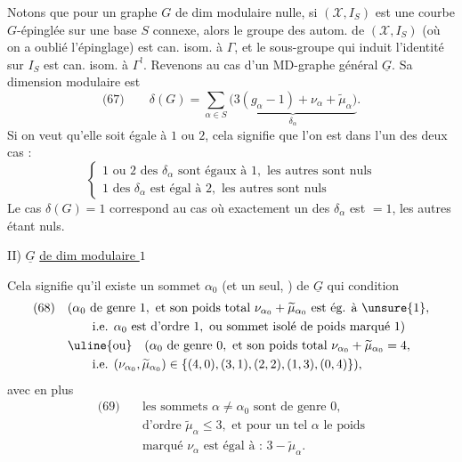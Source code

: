 Notons que pour un graphe $G$ de dim modulaire nulle, si $(\mathcal X,I_S)$ est une courbe  $G$-épinglée sur une base $S$ connexe, alors le groupe des autom. de $(\mathcal X,I_S)$ (où on a oublié l'épinglage) est can. isom. à $\Gamma$, et  le  sous-groupe qui induit l'identité sur $I_S$ est can. isom. à $\Gamma^!$.
Revenons au cas d'un MD-graphe général $\underline G$. Sa dimension modulaire est
\[
\text{(67)}\qquad\delta(G)=\sum_{\alpha\in S}\underbrace{\bigl(3(g_\alpha-1)+\nu_\alpha+\widetilde\mu_\alpha\bigr)}_{\delta_\alpha}.
\]
Si on veut qu'elle soit égale à $1$ ou $2$, cela signifie que l'on est dans l'un des deux cas :
\[
\left\{\begin{array}{l}
1\text{ ou }2\text{ des }\delta_\alpha\text{ sont égaux à }1,\text{ les autres sont nuls}\\
1\text{ des }\delta_\alpha\text{ est égal à }2,\text{ les autres sont nuls}
\end{array}\right.
\]
Le cas $\delta(G)=1$ correspond au cas où exactement un des $\delta_\alpha$ est $=1$, les autres étant nuls.

II) $\underline G$ \uline{de dim modulaire $1$}

Cela signifie qu'il existe un sommet $\alpha_0$ (et un seul, ) de $\underline G$ qui   condition
\[
\begin{aligned}
\text{(68)}\quad &(\alpha_0\text{ de genre }1,\text{ et son poids total }\nu_{\alpha_0}+\widetilde\mu_{\alpha_0}\text{ est ég. à }\unsure{1},\\
&\qquad\text{i.e. }\alpha_0\text{ est d'ordre }1,\text{ ou sommet isolé de poids marqué }1)\\
&\uline{\text{ou}}\quad(\alpha_0\text{ de genre }0,\text{ et son poids total }\nu_{\alpha_0}+\widetilde\mu_{\alpha_0}=4,\\
&\qquad\text{i.e. }(\nu_{\alpha_0},\widetilde\mu_{\alpha_0})\in\{(4,0),(3,1),(2,2),(1,3),(0,4)\}),
\end{aligned}
\]
avec en plus
\[
\begin{aligned}
\text{(69)}\quad&\text{les sommets }\alpha\ne\alpha_0\text{ sont de genre }0,\\
&\text{d'ordre }\widetilde\mu_\alpha\leq3,\text{ et pour un tel }\alpha\text{ le poids}\\
&\text{marqué }\nu_\alpha\text{ est égal à : }3-\widetilde\mu_\alpha.
\end{aligned}
\]

